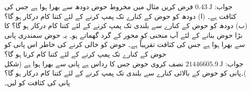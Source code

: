 جواب:\quad
$\SI{0.43}{\joule}$
فرض کریں مثال  میں مخروط حوض دودھ سے بھرا ہوا ہے جس کی کثافت  ہے۔ (ا) دودھ کو حوض کے کنارے تک پمپ کرنے کے لئے کتنا کام درکار ہو گا؟  (ب) دودھ کو حوض کے کنارے سے  بلندی تک پمپ کرنے کے لئے کتنا کام درکار ہو گا؟
 کا بڑا حوض بنانے کے لئے آپ
 منحنی  کو محور  کے گرد گھماتے ہو۔ یہ حوض سمندری پانی سے بھرا ہوا ہے جس کی کثافت تقریباً   ہے۔ حوض کو خالی کرنے کی خاطر اس پانی کو حوض کے کنارے تک پمپ کرنے کے لئے کتنا کام کرنا ہو گا؟\\
جواب:\quad
$\SI{21446605.9}{\joule}$
نصف کروی حوض جس کا رداس  ہے پانی سے بھرا ہوا ہے (شکل )۔پانی کو حوض کے بالائی کنارے سے  بلندی تک پمپ کرنے کے لئے کتنا کام درکار ہو گا؟ پانی کی کثافت کو  لیں۔
